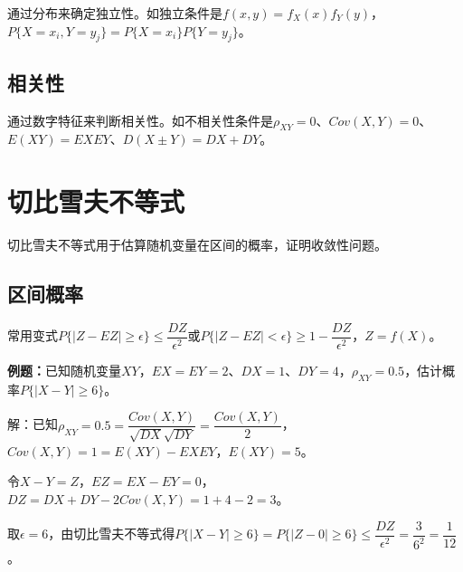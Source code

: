 通过分布来确定独立性。如独立条件是$f(x,y)=f_X(x)f_Y(y)$，$P\{X=x_i,Y=y_j\}=P\{X=x_i\}P\{Y=y_j\}$。

\subsection{相关性}

通过数字特征来判断相关性。如不相关性条件是$\rho_{XY}=0$、$Cov(X,Y)=0$、$E(XY)=EXEY$、$D(X\pm Y)=DX+DY$。

\section{切比雪夫不等式}

切比雪夫不等式用于估算随机变量在区间的概率，证明收敛性问题。

\subsection{区间概率}

常用变式$P\{\vert Z-EZ\vert\geqslant\epsilon\}\leqslant\dfrac{DZ}{\epsilon^2}$或$P\{\vert Z-EZ\vert<\epsilon\}\geqslant1-\dfrac{DZ}{\epsilon^2}$，$Z=f(X)$。

\textbf{例题：}已知随机变量$XY$，$EX=EY=2$、$DX=1$、$DY=4$，$\rho_{XY}=0.5$，估计概率$P\{\vert X-Y\vert\geqslant6\}$。

解：已知$\rho_{XY}=0.5=\dfrac{Cov(X,Y)}{\sqrt{DX}\sqrt{DY}}=\dfrac{Cov(X,Y)}{2}$，$Cov(X,Y)=1=E(XY)-EXEY$，$E(XY)=5$。

令$X-Y=Z$，$EZ=EX-EY=0$，$DZ=DX+DY-2Cov(X,Y)=1+4-2=3$。

取$\epsilon=6$，由切比雪夫不等式得$P\{\vert X-Y\vert\geqslant6\}=P\{\vert Z-0\vert\geqslant6\}\leqslant\dfrac{DZ}{\epsilon^2}=\dfrac{3}{6^2}=\dfrac{1}{12}$。

%
